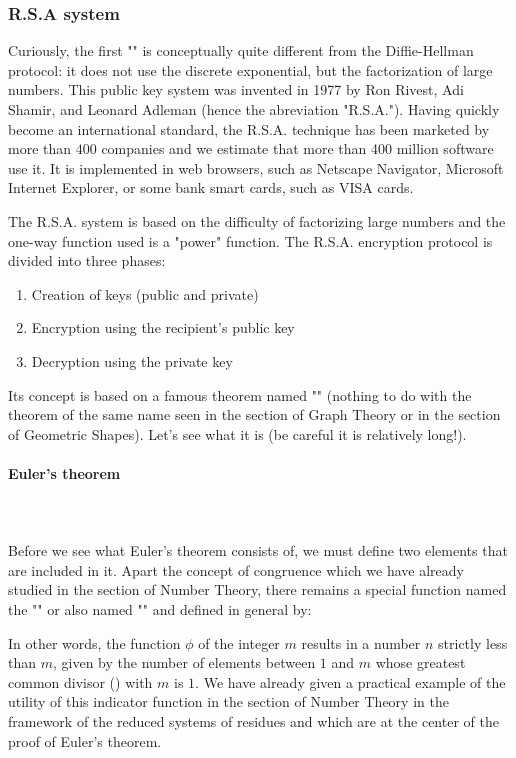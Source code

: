 	\subsubsection{R.S.A system}
	Curiously, the first "" is conceptually quite different from the Diffie-Hellman protocol: it does not use the discrete exponential, but the factorization of large numbers. This public key system was invented in 1977 by Ron Rivest, Adi Shamir, and Leonard Adleman (hence the abreviation "R.S.A."). Having quickly become an international standard, the R.S.A. technique has been marketed by more than $400$ companies and we estimate that more than 400 million software use it. It is implemented in web browsers, such as Netscape Navigator, Microsoft Internet Explorer, or some bank smart cards, such as VISA cards.

	The R.S.A. system is based on the difficulty of factorizing large numbers and the one-way function used is a "power" function. The R.S.A. encryption protocol is divided into three phases:
	\begin{enumerate}
		\item Creation of keys (public and private)

		\item Encryption using the recipient's public key

		\item Decryption using the private key
	\end{enumerate}
	Its concept is based on a famous theorem named "" (nothing to do with the theorem of the same name seen in the section of Graph Theory or in the section of Geometric Shapes). Let's see what it is (be careful it is relatively long!).
	
	\paragraph{Euler's theorem}\mbox{}\\\\
	Before we see what Euler's theorem consists of, we must define two elements that are included in it. Apart the concept of congruence which we have already studied in the section of Number Theory, there remains a special function named the "" or also named "" and defined in general by:
	
	In other words, the function $\phi$ of the integer $m$ results in a number $n$ strictly less than $m$, given by the number of elements between $1$ and $m$ whose greatest common divisor () with $m$ is $1$. We have already given a practical example of the utility of this indicator function in the section of Number Theory in the framework of the reduced systems of residues and which are at the center of the proof of Euler's theorem.
	
